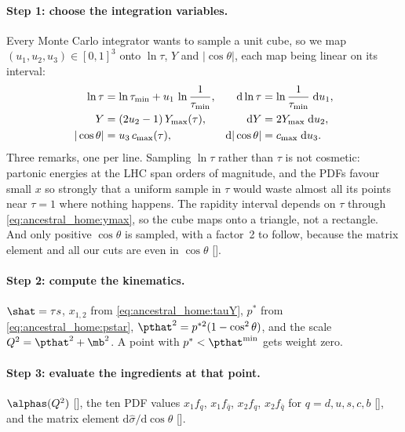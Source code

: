 \paragraph{Step 1: choose the integration variables.} Every Monte Carlo
integrator wants to sample a unit cube, so we map
$(u_1,u_2,u_3)\in[0,1]^3$ onto $\ln\tau$, $Y$ and $|\cos\theta|$, each map
being linear on its interval:
\begin{align}
  \ln\tau &= \ln\tau_{\min} + u_1\,\ln\frac{1}{\tau_{\min}},
  & \mathrm{d}\ln\tau &= \ln\frac{1}{\tau_{\min}}\;\mathrm{d}u_1, \notag\\
  Y &= (2u_2-1)\,Y_{\max}(\tau),
  & \mathrm{d}Y &= 2Y_{\max}\;\mathrm{d}u_2, \label{eq:ancestral_home:maps}\\
  |\cos\theta| &= u_3\,c_{\max}(\tau),
  & \mathrm{d}|\cos\theta| &= c_{\max}\;\mathrm{d}u_3 . \notag
\end{align}
Three remarks, one per line. Sampling $\ln\tau$ rather than $\tau$ is not
cosmetic: partonic energies at the LHC span orders of magnitude, and the
PDFs favour small $x$ so strongly that a uniform sample in $\tau$ would waste
almost all its points near $\tau=1$ where nothing happens. The rapidity
interval depends on $\tau$ through \cref{eq:ancestral_home:ymax}, so the
cube maps onto a triangle, not a rectangle. And only positive $\cos\theta$ is
sampled, with a factor~2 to follow, because the matrix element and all our
cuts are even in $\cos\theta$ [].

\paragraph{Step 2: compute the kinematics.} $\shat=\tau s$, $x_{1,2}$ from
\cref{eq:ancestral_home:tauY}, $p^{*}$ from \cref{eq:ancestral_home:pstar},
$\pthat^2=p^{*2}(1-\cos^2\theta)$, and the scale $Q^2=\pthat^2+\mb^2$. A
point with $p^{*}<\pthat^{\min}$ gets weight zero.

\paragraph{Step 3: evaluate the ingredients at that point.} $\alphas(Q^2)$
[], the ten PDF values $x_1f_q$, $x_1f_{\bar q}$,
$x_2f_q$, $x_2f_{\bar q}$ for $q=d,u,s,c,b$ [], and the
matrix element $\mathrm{d}\hat\sigma/\mathrm{d}\cos\theta$
[].

